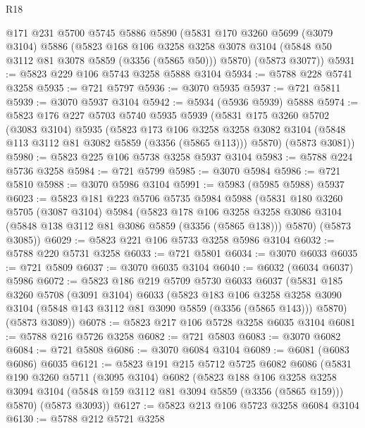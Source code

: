 \begin{lexlean}{R18}
\begin{coremodule}
    @171
    @231
    @5700
    @5745
    @5886
    @5890
    (@5831
      @170
      @3260
      @5699
      (@3079 @3104)
      @5886
      (@5823
        @168
        @106
        @3258
        @3258
        @3078
        @3104
        (@5848 @50 @3112 @81 @3078 @5859 (@3356 (@5865 @50)))
        @5870)
      (@5873 @3077))
@5931 := @5823 @229 @106 @5743 @3258 @5888 @3104
@5934 := @5788 @228 @5741 @3258
@5935 := @721 @5797
@5936 := @3070 @5935
@5937 := @721 @5811
@5939 := @3070 @5937 @3104
@5942 := @5934 (@5936 @5939) @5888
@5974 := @5823
    @176
    @227
    @5703
    @5740
    @5935
    @5939
    (@5831
      @175
      @3260
      @5702
      (@3083 @3104)
      @5935
      (@5823
        @173
        @106
        @3258
        @3258
        @3082
        @3104
        (@5848 @113 @3112 @81 @3082 @5859 (@3356 (@5865 @113)))
        @5870)
      (@5873 @3081))
@5980 := @5823 @225 @106 @5738 @3258 @5937 @3104
@5983 := @5788 @224 @5736 @3258
@5984 := @721 @5799
@5985 := @3070 @5984
@5986 := @721 @5810
@5988 := @3070 @5986 @3104
@5991 := @5983 (@5985 @5988) @5937
@6023 := @5823
    @181
    @223
    @5706
    @5735
    @5984
    @5988
    (@5831
      @180
      @3260
      @5705
      (@3087 @3104)
      @5984
      (@5823
        @178
        @106
        @3258
        @3258
        @3086
        @3104
        (@5848 @138 @3112 @81 @3086 @5859 (@3356 (@5865 @138)))
        @5870)
      (@5873 @3085))
@6029 := @5823 @221 @106 @5733 @3258 @5986 @3104
@6032 := @5788 @220 @5731 @3258
@6033 := @721 @5801
@6034 := @3070 @6033
@6035 := @721 @5809
@6037 := @3070 @6035 @3104
@6040 := @6032 (@6034 @6037) @5986
@6072 := @5823
    @186
    @219
    @5709
    @5730
    @6033
    @6037
    (@5831
      @185
      @3260
      @5708
      (@3091 @3104)
      @6033
      (@5823
        @183
        @106
        @3258
        @3258
        @3090
        @3104
        (@5848 @143 @3112 @81 @3090 @5859 (@3356 (@5865 @143)))
        @5870)
      (@5873 @3089))
@6078 := @5823 @217 @106 @5728 @3258 @6035 @3104
@6081 := @5788 @216 @5726 @3258
@6082 := @721 @5803
@6083 := @3070 @6082
@6084 := @721 @5808
@6086 := @3070 @6084 @3104
@6089 := @6081 (@6083 @6086) @6035
@6121 := @5823
    @191
    @215
    @5712
    @5725
    @6082
    @6086
    (@5831
      @190
      @3260
      @5711
      (@3095 @3104)
      @6082
      (@5823
        @188
        @106
        @3258
        @3258
        @3094
        @3104
        (@5848 @159 @3112 @81 @3094 @5859 (@3356 (@5865 @159)))
        @5870)
      (@5873 @3093))
@6127 := @5823 @213 @106 @5723 @3258 @6084 @3104
@6130 := @5788 @212 @5721 @3258

\end{coremodule}
\end{lexlean}
